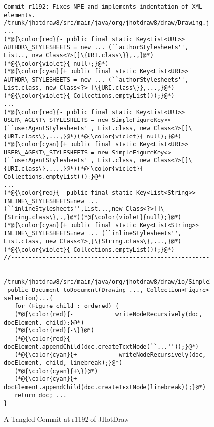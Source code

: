\begin{figure}[t]
	\centering
	\begin{lstlisting}[]
Commit r1192: Fixes NPE and implements indentation of XML elements.
/trunk/jhotdraw8/src/main/java/org/jhotdraw8/draw/Drawing.java
...
(*@{\color{red}{- public final static Key<List<URL>> AUTHOR\_STYLESHEETS = new ... (``authorStylesheets'', List.., new Class<?>[]\{URI.class\}},.,}@*)(*@{\color{violet}{ null);}@*)
(*@{\color{cyan}{+ public final static Key<List<URI>> AUTHOR\_STYLESHEETS = new ... (``authorStylesheets'', List.class, new Class<?>[]\{URI.class\}},...,}@*)(*@{\color{violet}{ Collections.emptyList());}@*)
...
(*@{\color{red}{- public final static Key<List<URI>> USER\_AGENT\_STYLESHEETS = new SimpleFigureKey<>(``userAgentStylesheets'', List.class, new Class<?>[]\{URI.class\},...,}@*)(*@{\color{violet}{ null);}@*)
(*@{\color{cyan}{+ public final static Key<List<URI>> USER\_AGENT\_STYLESHEETS = new SimpleFigureKey<> (``userAgentStylesheets'', List.class, new Class<?>[]\{URI.class\},...,}@*)(*@{\color{violet}{ Collections.emptyList());}@*)
...
(*@{\color{red}{- public final static Key<List<String>> INLINE\_STYLESHEETS=new ... (``inlineStylesheets'',List...,new Class<?>[]\{String.class\},.,}@*)(*@{\color{violet}{null);}@*)
(*@{\color{cyan}{+ public final static Key<List<String>> INLINE\_STYLESHEETS=new ... (``inlineStylesheets'', List.class, new Class<?>[]\{String.class\},...,}@*)(*@{\color{violet}{ Collections.emptyList());}@*)
//--------------------------------------------------------------------------
 /trunk/jhotdraw8/src/main/java/org/jhotdraw8/draw/io/SimpleXmlIO.java
 public Document toDocument(Drawing ..., Collection<Figure> selection)...{
   for (Figure child : ordered) {
   (*@{\color{red}{-            writeNodeRecursively(doc, docElement, child);}@*)
   (*@{\color{red}{-\}}@*)
   (*@{\color{red}{-          docElement.appendChild(doc.createTextNode(``...''));}@*)
   (*@{\color{cyan}{+            writeNodeRecursively(doc, docElement, child, linebreak);}@*)
   (*@{\color{cyan}{+\}}@*)
   (*@{\color{cyan}{+          docElement.appendChild(doc.createTextNode(linebreak));}@*)
   return doc; ...
}          
	\end{lstlisting}
        \vspace{-15pt}
        \caption{A Tangled Commit at r1192 of JHotDraw}
        \label{fig:motiv-cc}
\end{figure}



